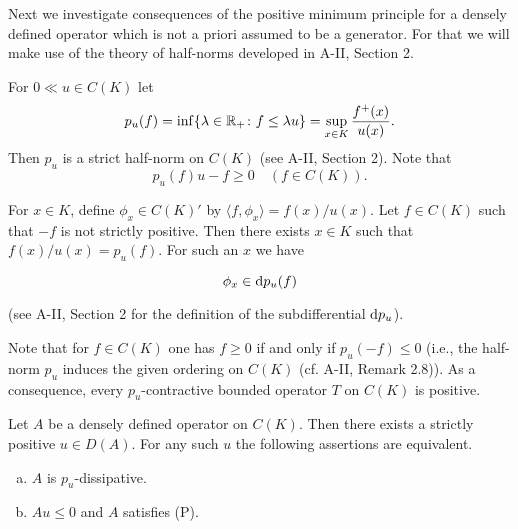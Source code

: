 Next we investigate consequences of the positive minimum principle for a densely defined operator which is not a priori assumed to be a generator.
For that we will make use of the theory of half-norms developed in A-II, Section 2.

For $0  \ll u \in C(K)$ let
\begin{equation}\label{eq:b2-1.4}
p_{u}(f) = \inf\{\lambda \in \mathbb{R}_{+} \colon f \leq \lambda u\} = \sup_{x \in K} \frac{f^{+}(x)}{u(x)}.
\end{equation}
Then $p_{u}$ is a strict half-norm on $C(K)$ (see A-II, Section  2).
Note that
\begin{equation}\label{eq:b2-1.5}
p_{u}(f)u - f \geq 0 \quad (f \in C(K)).
\end{equation}

For $x \in K$, define $\phi_{x} \in C(K)'$ by $\langle f,\phi_{x} \rangle = f(x)/u(x)$.
Let $f \in C(K)$ such that $-f$ is not strictly positive.
Then there exists $x \in K$ such that $f(x)/u(x) = p_{u}(f)$.
For such an $x$ we have

\begin{equation}\label{eq:b2-1.6}
\phi_{x} \in \mathop{}\!\mathrm{d}{p}_{u}(f)
\end{equation}


(see A-II, Section 2 for the definition of the subdifferential $\mathop{}\!\mathrm{d}{p}_{u}$).

Note that for $f \in C(K)$ one has $f \geq 0$ if and only if $p_{u}(-f) \leq 0$ (i.e., the half-norm $p_{u}$ induces the given ordering on $C(K)$ (cf. A-II, Remark 2.8)).
As a consequence, every $p_{u}$-contractive bounded operator $T$ on $C(K)$ is positive.

\begin{proposition}\label{prop:b2-1.10}
Let $A$ be a densely defined operator on $C(K)$.
Then there exists a strictly positive $u \in D(A)$.
For any such $u$ the following assertions are equivalent.
\begin{enumerate}[(a)]
\item  \label{prop:b2-1.10-1}
$A$ is $p_{u}$-dissipative.

\item  \label{prop:b2-1.10-2}
$Au \leq 0$ and $A$ satisfies (P).
\end{enumerate}
\end{proposition}

